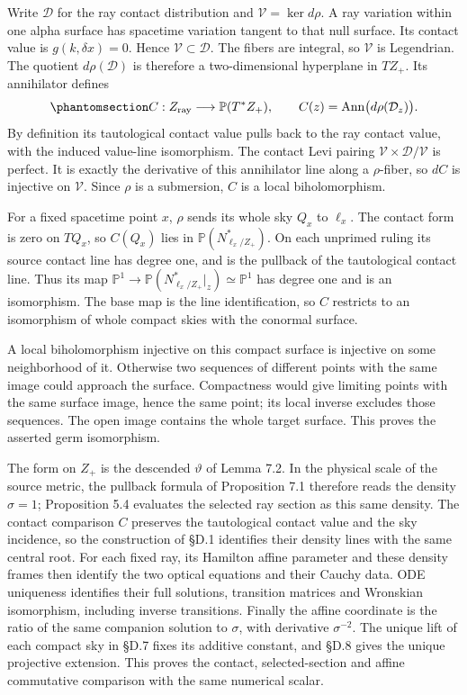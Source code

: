\documentclass[
  english,
  11pt,
  reqno]{amsart}
\begin{document}
Write \(\mathcal D\) for the ray contact distribution and
\(\mathcal V=\ker d\rho\). A ray variation within one alpha surface has
spacetime variation tangent to that null surface. Its contact value is
\(g(k,\delta x)=0\). Hence \(\mathcal V\subset\mathcal D\). The fibers
are integral, so \(\mathcal V\) is Legendrian. The quotient
\(d\rho(\mathcal D)\) is therefore a two-dimensional hyperplane in
\(T Z_+\). Its annihilator defines
\begin{equation}\protect\phantomsection\label{eq:gg-chiral-contact-annihilator-map}{
 C:Z_{\mathrm{ray}}\longrightarrow\mathbb P(T^*Z_+),\qquad
 C(z)=\operatorname{Ann}\bigl(d\rho(\mathcal D_z)\bigr).
}\end{equation} By definition its tautological contact value pulls back
to the ray contact value, with the induced value-line isomorphism. The
contact Levi pairing \(\mathcal V\times\mathcal D/\mathcal V\) is
perfect. It is exactly the derivative of this annihilator line along a
\(\rho\)-fiber, so \(dC\) is injective on \(\mathcal V\). Since \(\rho\)
is a submersion, \(C\) is a local biholomorphism.

For a fixed spacetime point \(x\), \(\rho\) sends its whole sky \(Q_x\)
to \(\ell_x\). The contact form is zero on \(TQ_x\), so \(C(Q_x)\) lies
in \(\mathbb P(N^*_{\ell_x/Z_+})\). On each unprimed ruling its source
contact line has degree one, and is the pullback of the tautological
contact line. Thus its map
\(\mathbb P^1\to\mathbb P(N^*_{\ell_x/Z_+}|_z)\simeq\mathbb P^1\) has
degree one and is an isomorphism. The base map is the line
identification, so \(C\) restricts to an isomorphism of whole compact
skies with the conormal surface.

A local biholomorphism injective on this compact surface is injective on
some neighborhood of it. Otherwise two sequences of different points
with the same image could approach the surface. Compactness would give
limiting points with the same surface image, hence the same point; its
local inverse excludes those sequences. The open image contains the
whole target surface. This proves the asserted germ isomorphism.

The form on \(Z_+\) is the descended \(\vartheta\) of Lemma 7.2. In the
physical scale of the source metric, the pullback formula of Proposition
7.1 therefore reads the density \(\sigma=1\); Proposition 5.4 evaluates
the selected ray section as this same density. The contact comparison
\(C\) preserves the tautological contact value and the sky incidence, so
the construction of §D.1 identifies their density lines with the same
central root. For each fixed ray, its Hamilton affine parameter and
these density frames then identify the two optical equations and their
Cauchy data. ODE uniqueness identifies their full solutions, transition
matrices and Wronskian isomorphism, including inverse transitions.
Finally the affine coordinate is the ratio of the same companion
solution to \(\sigma\), with derivative \(\sigma^{-2}\). The unique lift
of each compact sky in §D.7 fixes its additive constant, and §D.8 gives
the unique projective extension. This proves the contact,
selected-section and affine commutative comparison with the same
numerical scalar.
\end{document}
